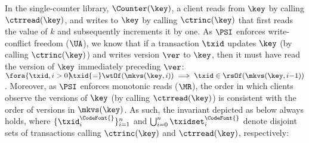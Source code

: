 In the single-counter library, $\Counter(\key)$, 
a client reads from $\key$ by calling $\ctrread(\key)$, and writes to $\key$ by calling $\ctrinc(\key)$ 
that first reads the value of $k$ and subsequently increments it by one.
As $\PSI$ enforces write-conflict freedom (\(\UA\)),
we know that if a transaction $\txid$ updates $\key$ (by calling $\ctrinc(\key)$) and writes version $\ver$ to $\key$, 
then it must have read the version of $\key$ immediately preceding $\ver$:
$\fora{\txid, i > 0}\!\! \txid {=} \wtOf(\mkvs(\key, i)) \implies \txid \in \rsOf(\mkvs(\key, i{-}1))$. 
Moreover, as $\PSI$ enforces monotonic reads ($\MR$),
the order in which clients observe the versions of $\key$ (by calling $\ctrread(\key)$)
is consistent with the order of versions in $\mkvs(\key)$. 
As such, the invariant depicted as below always holds, where  
$\{\txid^{\CodeFont{}}_{i}\}_{i=1}^{n}$ and $\bigcup_{i=0}^{n} \txidset^{\CodeFont{}}_{i}$ 
denote disjoint sets of transactions calling $\ctrinc(\key)$ and $\ctrread(\key)$, respectively:\\[3pt]
%
\noindent
\ 
